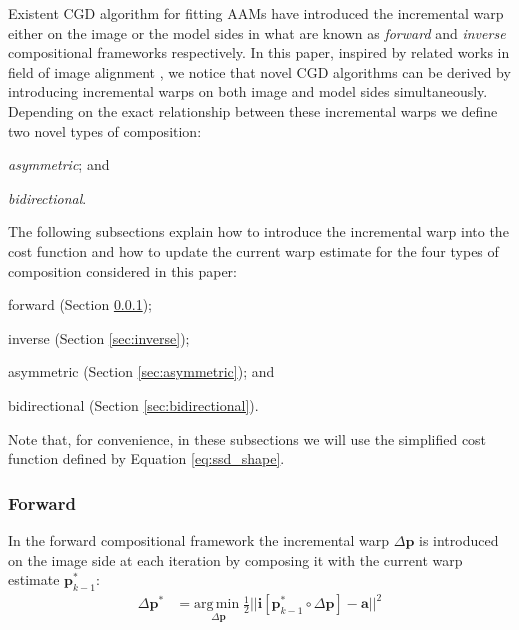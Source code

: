 Existent CGD algorithm for fitting AAMs have introduced the incremental warp either on the image or the model sides in what are known as \emph{forward} and \emph{inverse} compositional frameworks \cite{Matthews2004, Gross2005, Papandreou2008, Amberg2009, Martins2010, Tzimiropoulos2013} respectively. In this paper, inspired by related works in field of image alignment \cite{Malis2004, Megret2008, Autheserre2009, Megret2010}, we notice that novel CGD algorithms can be derived by introducing incremental warps on both image and model sides simultaneously. Depending on the exact relationship between these incremental warps we define two novel types of composition:
\begin{inparaenum}
    \item \emph{asymmetric}; and
    \item \emph{bidirectional}.
\end{inparaenum}

The following subsections explain how to introduce the incremental warp into the cost function and how to update the current warp estimate for the four types of composition considered in this paper: 
\begin{inparaenum}
    \item forward (Section \ref{sec:forward}); 
    \item inverse (Section \ref{sec:inverse});
    \item asymmetric (Section \ref{sec:asymmetric}); and
    \item bidirectional (Section \ref{sec:bidirectional}).
\end{inparaenum} Note that, for convenience, in these subsections we will use the simplified cost function defined by Equation \ref{eq:ssd_shape}.

\subsubsection{Forward}
\label{sec:forward}

In the forward compositional framework the incremental warp $\Delta \mathbf{p}$ is introduced on the image side at each iteration by composing it with the current warp estimate $\mathbf{p}_{k-1}^*$:
\begin{equation}
    \begin{aligned}
        \Delta \mathbf{p}^* & = \underset{\Delta \mathbf{p}} {\mathrm{arg\, min\;}} \frac{1}{2}|| \mathbf{i}[\mathbf{p}_{k-1}^* \circ \Delta \mathbf{p}] - \mathbf{a} ||^2
    \label{eq:ssd_fc}
    \end{aligned}
\end{equation}

